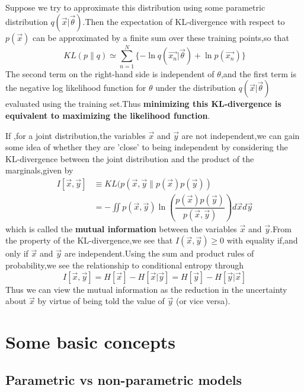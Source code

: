 Suppose we try to approximate this distribution using some parametric distribution $q(\vec{x}|\vec{\theta})$.Then the expectation of KL-divergence with respect to $p(\vec{x})$ can be approximated by a finite sum over these training points,so that
\begin{equation}
KL(p\parallel q) \simeq \sum_{n=1}^{N}\{-\ln q(\vec{x_n}|\vec{\theta}) + \ln p(\vec{x_n})\}
\end{equation}
The second term on the right-hand side is independent of $\theta$,and the first term is the negative log likelihood function for $\theta$ under the distribution $q(\vec{x}|\vec{\theta})$ evaluated using the training set.Thus \textbf{minimizing this KL-divergence is equivalent to maximizing the likelihood function}.


If ,for a joint distribution,the variables $\vec{x}$ and $\vec{y}$ are not independent,we can gain some idea of whether they are 'close' to being independent by considering the KL-divergence between the joint distribution and the product of the marginals,given by
\begin{align}
I[\vec{x},\vec{y}] &\equiv KL(p(\vec{x},\vec{y}\parallel p(\vec{x})p(\vec{y})) \\
& = -\iint p(\vec{x},\vec{y})\ln (\dfrac{p(\vec{x})p(\vec{y})}{p(\vec{x},\vec{y})})d\vec{x}d\vec{y}
\end{align}
which is called the \textbf{mutual information} between the variables $\vec{x}$ and $\vec{y}$.From the property of the KL-divergence,we see that $I(\vec{x},\vec{y}) \geq 0$ with equality if,and only if $\vec{x}$ and $\vec{y}$ are independent.Using the sum and product rules of probability,we see the relationship to conditional entropy through
\begin{equation}
I[\vec{x},\vec{y}] = H[\vec{x}] - H[\vec{x}|\vec{y}] = H[\vec{y}] - H[\vec{y}|\vec{x}]
\end{equation}
Thus we can view the mutual information as the reduction in the uncertainty about $\vec{x}$ by virtue of being told the value of $\vec{y}$ (or vice versa).


\section{Some basic concepts}

\subsection{Parametric vs non-parametric models}


